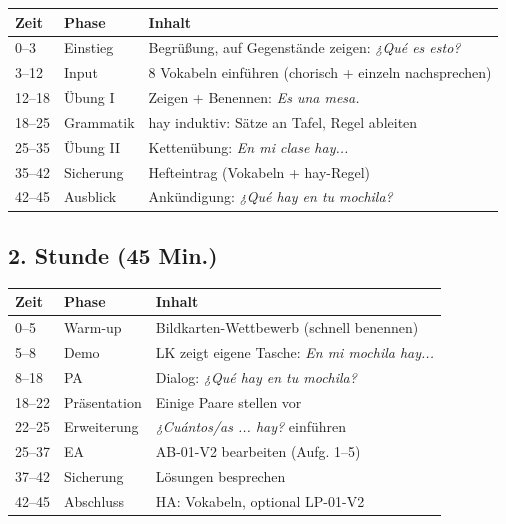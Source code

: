\documentclass[11pt,a4paper]{article}
\begin{document}
\begin{tabular}{|p{1.2cm}|p{2.5cm}|p{9cm}|}
\hline
\textbf{Zeit} & \textbf{Phase} & \textbf{Inhalt} \\
\hline
0--3 & Einstieg & Begrüßung, auf Gegenstände zeigen: \textit{¿Qué es esto?} \\
\hline
3--12 & Input & 8 Vokabeln einführen (chorisch + einzeln nachsprechen) \\
\hline
12--18 & Übung I & Zeigen + Benennen: \textit{Es una mesa.} \\
\hline
18--25 & Grammatik & hay induktiv: Sätze an Tafel, Regel ableiten \\
\hline
25--35 & Übung II & Kettenübung: \textit{En mi clase hay...} \\
\hline
35--42 & Sicherung & Hefteintrag (Vokabeln + hay-Regel) \\
\hline
42--45 & Ausblick & Ankündigung: \textit{¿Qué hay en tu mochila?} \\
\hline
\end{tabular}

\subsection*{2. Stunde (45 Min.)}

\begin{tabular}{|p{1.2cm}|p{2.5cm}|p{9cm}|}
\hline
\textbf{Zeit} & \textbf{Phase} & \textbf{Inhalt} \\
\hline
0--5 & Warm-up & Bildkarten-Wettbewerb (schnell benennen) \\
\hline
5--8 & Demo & LK zeigt eigene Tasche: \textit{En mi mochila hay...} \\
\hline
8--18 & PA & Dialog: \textit{¿Qué hay en tu mochila?} \\
\hline
18--22 & Präsentation & Einige Paare stellen vor \\
\hline
22--25 & Erweiterung & \textit{¿Cuántos/as ... hay?} einführen \\
\hline
25--37 & EA & AB-01-V2 bearbeiten (Aufg. 1--5) \\
\hline
37--42 & Sicherung & Lösungen besprechen \\
\hline
42--45 & Abschluss & HA: Vokabeln, optional LP-01-V2 \\
\hline
\end{tabular}

\vspace{0.5cm}

\end{document}
